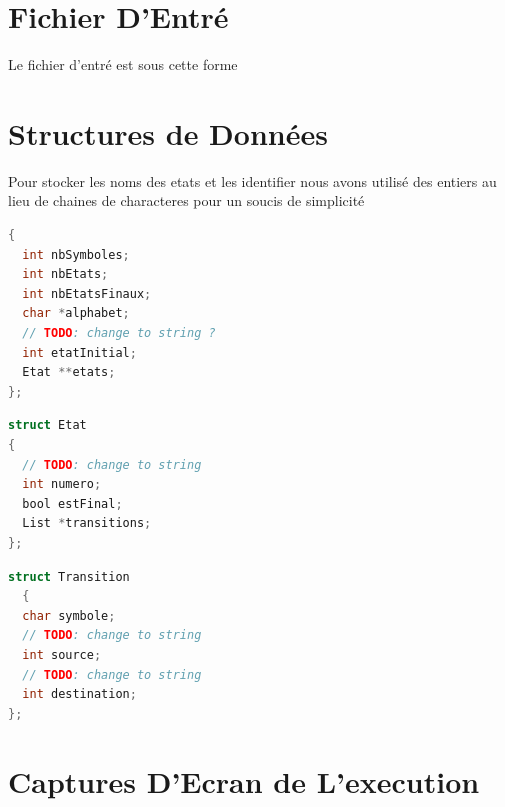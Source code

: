\documentclass{article}
\begin{document}
\section{Fichier D'Entré}
Le fichier d'entré est sous cette forme



\lstset{style=mystyle}



\section{Structures de Données}
Pour stocker les noms des etats et les identifier nous avons utilisé des entiers au lieu de chaines de characteres pour un soucis de simplicité
\begin{lstlisting}[language=C, caption=Structure Automate]
{
  int nbSymboles;
  int nbEtats;
  int nbEtatsFinaux;
  char *alphabet;
  // TODO: change to string ?
  int etatInitial;
  Etat **etats;
};
\end{lstlisting}

\begin{lstlisting}[language=C, caption=Structure Etat]
struct Etat
{
  // TODO: change to string
  int numero;
  bool estFinal;
  List *transitions;
};
\end{lstlisting}

\begin{lstlisting}[language=C, caption=Structure Etat]
struct Transition
  {
  char symbole;
  // TODO: change to string
  int source;
  // TODO: change to string
  int destination;
};
\end{lstlisting}



\section{Captures D'Ecran de L'execution}
\end{document}

